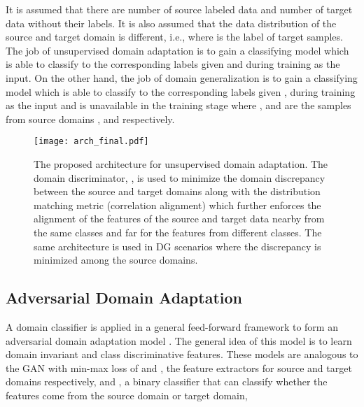 \documentclass[review]{elsarticle}
\begin{document}
It is assumed that there are  number of source labeled data  and  number of target data  without their labels. It is also assumed that the data distribution of the source and target domain is different, i.e.,    where  is the label of target samples. The job of unsupervised domain adaptation is to gain a classifying model  which is able to classify  to the corresponding labels  given  and  during training as the input. On the other hand, the job of domain generalization is to gain a classifying model  which is able to classify  to the corresponding labels  given ,    during training as the input and   is unavailable in the training stage where  ,  and  are the samples from source domains ,  and  respectively.
 
 
 
 \begin{figure}
\begin{center}
\texttt{[image: arch\_final.pdf]}
\end{center}
   \caption{The proposed architecture for unsupervised domain adaptation. The domain discriminator, , is used to minimize the domain discrepancy between the source and target domains along with the distribution matching metric (correlation alignment) which further enforces the alignment of the features of the source and target data nearby from the same classes and far for the features from different classes. The same architecture is used in DG scenarios where the discrepancy is minimized among the source domains.}
\label{fig:architecture}
\end{figure}

 
 
\subsection{Adversarial Domain Adaptation}

A domain classifier is applied in a general feed-forward framework to form an adversarial domain adaptation model \cite{pmlr-v37-ganin15,8099799}. The general idea of this model is to learn domain invariant and class discriminative features. These models are analogous to the GAN with min-max loss of  and , the feature extractors for source and target domains respectively, and , a binary classifier that can classify whether the features come from the source domain or target domain, 
\end{document}
